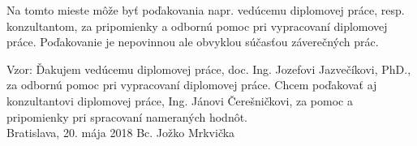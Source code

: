 \null
\vfill
\noindent
Na tomto mieste môže byť poďakovania napr. vedúcemu diplomovej práce, resp. konzultantom, za pripomienky a odbornú pomoc pri vypracovaní diplomovej práce. Poďakovanie je nepovinnou ale obvyklou súčasťou záverečných prác.

Vzor: Ďakujem vedúcemu diplomovej práce, doc. Ing. Jozefovi Jazvečíkovi, PhD., za odbornú pomoc pri vypracovaní diplomovej práce. Chcem poďakovať aj konzultantovi diplomovej práce, Ing. Jánovi Čerešničkovi, za pomoc a pripomienky pri spracovaní nameraných hodnôt.\\

\noindent Bratislava, 20. mája 2018 \hfill Bc. Jožko Mrkvička
\cleardoublepage

